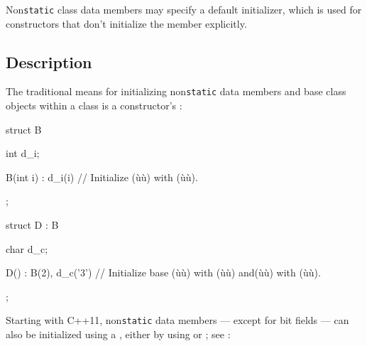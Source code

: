 


\label{default-member-initializers}
\setcounter{table}{0}
\setcounter{footnote}{0}
\setcounter{lstlisting}{0}

Non\lstinline!static! class data members may specify a default initializer,
which is used for constructors that don't initialize the member
explicitly.

\subsection[Description]{Description}\label{description}

The traditional means for initializing non\lstinline!static! data members
and base class objects within a class is a constructor's :

\begin{emcppslisting}
struct B
{
    int d_i;

    B(int i) : d_i(i) { }     // Initialize (ù{}ù) with (ù{}ù).
};

struct D : B
{
    char d_c;

    D() : B(2), d_c('3') { }  // Initialize base (ù{}ù) with (ù{}ù) and(ù{}ù) with (ù{}ù).
};
\end{emcppslisting}
    

Starting with C++11, non\lstinline!static! data members --- except for bit
fields --- can also be initialized using a , either by using  or
; see
:

